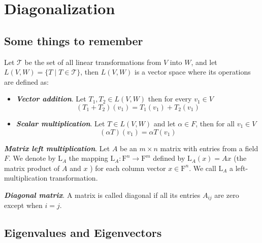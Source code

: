 \documentclass{report}
\begin{document}
    \tableofcontents
    \pagebreak
    \chapter{ Diagonalization }

    \section{Some things to remember}

    \begin{defBox}
        Let $\mathcal{T}$ be the set of all linear transformations from $V$ into $W$, and let $L(V,W) = \{T \mid T \in \mathcal{T}\}$, then $L(V,W)$ is a vector space where its operations are defined as:

        \begin{itemize}
            \item \textit{\textbf{Vector addition}}. Let $T_1, T_2 \in L(V,W)$ then for every $v_1 \in V$
            $$(T_1+T_2)(v_1) = T_1(v_1) + T_2(v_1)$$
            \item \textit{\textbf{Scalar multiplication}}. Let $T \in L(V,W)$ and let $\alpha \in F$, then for all $v_1 \in V$
            $$(\alpha T)(v_1) = \alpha T(v_1)$$
        \end{itemize}
    \end{defBox}

    \begin{defBox}
        \textit{\textbf{Matrix left multiplication}}. Let $A$ be an $m \times n$ matrix with entries from a field $F$. We denote by $\mathrm{L}_A$ the mapping $\mathrm{L}_A: \mathrm{F}^n \rightarrow \mathrm{F}^m$ defined by $\mathrm{L}_A(x)=A x$ (the matrix product of $A$ and $x$ ) for each column vector $x \in \mathrm{F}^n$. We call $\mathrm{L}_A$ a left-multiplication transformation.
    \end{defBox}

    \begin{defBox}
        \textit{\textbf{Diagonal matrix}}. A matrix is called diagonal if all its entries $A_{ij}$ are zero except when $i = j$.
    \end{defBox}

    \section{Eigenvalues and Eigenvectors}
\end{document}
